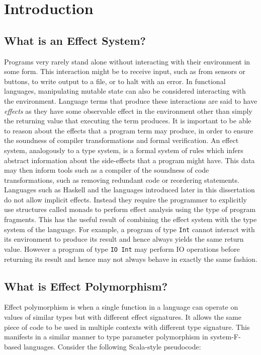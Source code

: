 \documentclass{Report}
\begin{document}
\tableofcontents

\chapter{Introduction}


\section{What is an Effect System?}

Programs very rarely stand alone without interacting with their environment in some form. This interaction might be to receive input, such as from sensors or buttons, to write output to a file, or to halt with an error. In functional languages, manipulating mutable state can also be considered interacting with the environment. Language terms that produce these interactions are said to have \textit{effects} as they have some observable effect in the environment other than simply the returning value that executing the term produces. It is important to be able to reason about the effects that a program term may produce, in order to ensure the soundness of compiler transformations and formal verification. An effect system, analogously to a type system, is a formal system of rules which infers abstract information about the side-effects that a program might have. This data may then inform tools such as a compiler of the soundness of code transformations, such as removing redundant code or reordering statements. Languages such as Haskell and the languages introduced later in this dissertation do not allow implicit effects. Instead they require the programmer to explicitly use structures called monads \cite{MoggiMonads} to perform effect analysis using the type of program fragments. This has the useful result of combining the effect system with the type system of the language. For example, a program of type \texttt{Int} cannot interact with its environment to produce its result and hence always yields the same return value. However a program of type \texttt{IO Int} may perform IO operations before returning its result and hence may not always behave in exactly the same fashion.

\section{What is Effect Polymorphism?}


Effect polymorphism is when a single function in a language can operate on values of similar types but with different effect signatures. It allows the same piece of code to be used in multiple contexts with different type signature. This manifests in a similar manner to type parameter polymorphism in system-F-based languages. Consider the following Scala-style pseudocode:
\renewcommand\o[1]{\textcolor{orange}{#1}}
\newcommand\bl[1]{\textcolor{blue}{#1}}
\newcommand\gr[1]{\textcolor{DarkGreen}{#1}}
\newcommand\pl[1]{\textcolor{purple}{#1}}
\newcommand\cy[1]{\textcolor{cyan}{#1}}
\newcommand\red[1]{\textcolor{red}{#1}}
\end{document}
